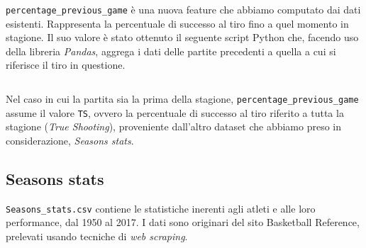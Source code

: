 \texttt{percentage\_previous\_game} è una nuova feature che abbiamo computato dai dati esistenti. Rappresenta la percentuale di successo al tiro fino a quel momento in stagione. Il suo valore è stato ottenuto il seguente script Python che, facendo uso della libreria \textit{Pandas}, aggrega i dati delle partite precedenti a quella a cui si riferisce il tiro in questione.

\begin{code}
\inputminted[breaklines]{python}{../datasets/shot_logs_nv.py}
\end{code}

Nel caso in cui la partita sia la prima della stagione, \texttt{percentage\_previous\_game} assume il valore \texttt{TS}, ovvero la percentuale di successo al tiro riferito a tutta la stagione (\textit{True Shooting}), proveniente dall’altro dataset che abbiamo preso in considerazione, \textit{Seasons stats}.

\subsection{Seasons stats}

\texttt{Seasons\_stats.csv} \cite{season_stats} contiene le statistiche inerenti agli atleti e alle loro performance, dal 1950 al 2017. I dati sono originari del sito Basketball Reference\cite{basketball-reference}, prelevati usando tecniche di \textit{web scraping}.

